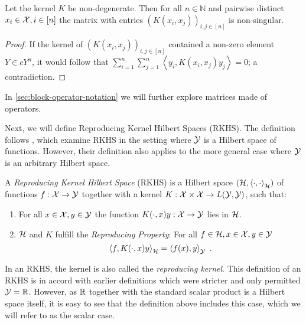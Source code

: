 \begin{lemma}
	\label{lem:kernel-non-singular}
	Let the kernel $K$ be non-degenerate.
	Then for all $n \in \mathbb{N}$ and pairwise distinct $x_i \in \mathcal{X}, i \in [n]$ the matrix with entries $(K(x_i, x_j))_{i, j \in [n]}$ is non-singular.
\end{lemma}
\begin{proof}
	If the kernel of $(K(x_i, x_j))_{i, j \in [n]}$ contained a non-zero element $Y \in cY^n$, it would follow that $\sum_{i=1}^n \sum_{j=1}^n \left< y_i, K(x_i, x_j)  y_j\right> = 0$; a contradiction.
\end{proof}
In \cref{sec:block-operator-notation} we will further explore matrices made of operators.

Next, we will define Reproducing Kernel Hilbert Spaces (RKHS).
The definition follows \citet{kadri16}, which examine RKHS in the setting where $\mathcal{Y}$ is a Hilbert space of functions.
However, their definition also applies to the more general case where $\mathcal{Y}$ is an arbitrary Hilbert space.
\begin{definition}
	\label{def:rkhs}
	A \emph{Reproducing Kernel Hilbert Space} (RKHS) is a Hilbert space $(\mathcal{H}, \left<\cdot, \cdot\right>_{\mathcal{H}})$ of functions $f: \mathcal{X} \rightarrow \mathcal{Y}$ together with a kernel $K: \mathcal{X} \times \mathcal{X} \rightarrow L(\mathcal{Y}, \mathcal{Y})$, such that:
	\begin{enumerate}
		\item For all $x\in \mathcal{X}, y \in \mathcal{Y}$ the function $K(\cdot, x) y: \mathcal{X} \rightarrow \mathcal{Y}$ lies in $\mathcal{H}$.
		\item $\mathcal{H}$ and $K$ fulfill the \emph{Reproducing Property}: For all $f \in \mathcal{H}, x \in \mathcal{X}, y \in \mathcal{Y}$
		\begin{equation}
			\label{eq:reproducing-property}
			\left< f, K(\cdot, x) y \right>_{\mathcal{H}} = \left< f(x), y\right>_{\mathcal{Y}} \ .
		\end{equation}
	\end{enumerate}
\end{definition}

In an RKHS, the kernel is also called the \emph{reproducing kernel}.
This definition of an RKHS is in accord with earlier definitions \cite{berlinet04, sejdinovic12} which were stricter and only permitted $\mathcal{Y} = \mathbb{R}$.
However, as $\mathbb{R}$ together with the standard scalar product is a Hilbert space itself, it is easy to see that the definition above includes this case, which we will refer to as the scalar case.

